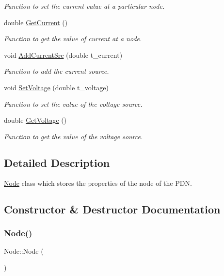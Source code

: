 \begin{DoxyCompactItemize}
\begin{DoxyCompactList}\small\item\em Function to set the current value at a particular node. \end{DoxyCompactList}\item 
double \hyperlink{classNode_aa91dbf36b0f693850cf422bebb7632ee}{Get\+Current} ()
\begin{DoxyCompactList}\small\item\em Function to get the value of current at a node. \end{DoxyCompactList}\item 
void \hyperlink{classNode_a252ea83ae41b143c652701749de63199}{Add\+Current\+Src} (double t\+\_\+current)
\begin{DoxyCompactList}\small\item\em Function to add the current source. \end{DoxyCompactList}\item 
void \hyperlink{classNode_af5846cceb0ea097fdfba48152402c152}{Set\+Voltage} (double t\+\_\+voltage)
\begin{DoxyCompactList}\small\item\em Function to set the value of the voltage source. \end{DoxyCompactList}\item 
double \hyperlink{classNode_ad924c345106b6e7b0847762290052fac}{Get\+Voltage} ()
\begin{DoxyCompactList}\small\item\em Function to get the value of the voltage source. \end{DoxyCompactList}\end{DoxyCompactItemize}


\subsection{Detailed Description}
\hyperlink{classNode}{Node} class which stores the properties of the node of the P\+DN. 

\subsection{Constructor \& Destructor Documentation}
\mbox{\label{classNode_ad7a34779cad45d997bfd6d3d8043c75f}} 
\subsubsection{\texorpdfstring{Node()}{Node()}}
{\footnotesize\ttfamily Node\+::\+Node (\begin{DoxyParamCaption}{ }\end{DoxyParamCaption})\hspace{0.3cm}{\ttfamily [inline]}}

